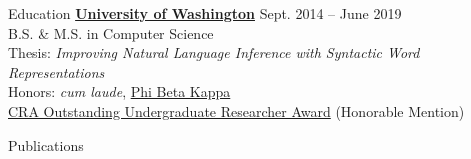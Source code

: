 \documentclass{resume}
\begin{document}
\begin{rSection}{Education}
	{\href{https://www.cs.washington.edu/}
		{\bf University of Washington}} \hfill {Sept. 2014 -- June 2019} \\
	B.S. \& M.S. in Computer Science \\
	Thesis: \emph{Improving Natural Language Inference with Syntactic Word Representations} \\
	Honors: \emph{cum laude}, \href{https://www.pbk.org/web}
	{Phi Beta Kappa} \\
	\href{https://cra.org/about/awards/outstanding-undergraduate-researcher-award/}
	{CRA Outstanding Undergraduate Researcher Award} (Honorable Mention)

\end{rSection}

\begin{rSection}{Publications}
	\vspace{1.5em}
	
	
\end{rSection}
\end{document}
